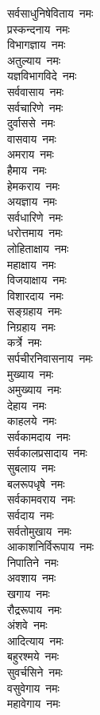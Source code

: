 \begin{multicols}{2}
\begin{flushleft}
सर्वसाधुनिषेविताय~नमः\\
प्रस्कन्दनाय~नमः\\
विभागज्ञाय~नमः\\
अतुल्याय~नमः\\
यज्ञविभागविदे~नमः\\
सर्ववासाय~नमः\\
सर्वचारिणे~नमः\\
दुर्वाससे~नमः\\
वासवाय~नमः\\
अमराय~नमः\hfill{}\\
हैमाय~नमः\\
हेमकराय~नमः\\
अयज्ञाय~नमः\\
सर्वधारिणे~नमः\\
धरोत्तमाय~नमः\\
लोहिताक्षाय~नमः\\
महाक्षाय~नमः\\
विजयाक्षाय~नमः\\
विशारदाय~नमः\\
सङ्ग्रहाय~नमः\hfill{}\\
निग्रहाय~नमः\\
कर्त्रे~नमः\\
सर्पचीरनिवासनाय~नमः\\
मुख्याय~नमः\\
अमुख्याय~नमः\\
देहाय~नमः\\
काहलये~नमः\\
सर्वकामदाय~नमः\\
सर्वकालप्रसादाय~नमः\\
सुबलाय~नमः\hfill{}\\
बलरूपधृषे~नमः\\
सर्वकामवराय~नमः\\
सर्वदाय~नमः\\
सर्वतोमुखाय~नमः\\
आकाशनिर्विरूपाय~नमः\\
निपातिने~नमः\\
अवशाय~नमः\\
खगाय~नमः\\
रौद्ररूपाय~नमः\\
अंशवे~नमः\hfill{}\\
आदित्याय~नमः\\
बहुरश्मये~नमः\\
सुवर्चसिने~नमः\\
वसुवेगाय~नमः\\
महावेगाय~नमः\\

\end{flushleft}
\end{multicols}
